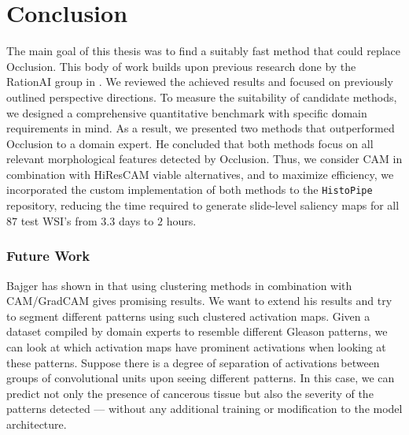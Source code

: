\chapter*{Conclusion}

The main goal of this thesis was to find a suitably fast method that could replace Occlusion.
This body of work builds upon previous research done by the RationAI group in \cite{gallo, bajger-grad-cam, krajnansky-grad-cam, hruska-grad-cam}.
We reviewed the achieved results and focused on previously outlined perspective directions.
To measure the suitability of candidate methods, we designed a comprehensive quantitative benchmark with specific domain requirements in mind.
As a result, we presented two methods that outperformed Occlusion to a domain expert.
He concluded that both methods focus on all relevant morphological features detected by Occlusion.
Thus, we consider CAM in combination with HiResCAM viable alternatives, and to maximize efficiency, we incorporated the custom implementation of both methods to the \texttt{HistoPipe} repository, reducing the time required to generate slide-level saliency maps for all $87$ test WSI's from $3.3$ days to $2$ hours.

\subsection*{Future Work}

Bajger has shown in \cite{bajger-grad-cam} that using clustering methods in combination with CAM/GradCAM gives promising results.
We want to extend his results and try to segment different patterns using such clustered activation maps.
Given a dataset compiled by domain experts to resemble different Gleason patterns, we can look at which activation maps have prominent activations when looking at these patterns.
Suppose there is a degree of separation of activations between groups of convolutional units upon seeing different patterns. In this case, we can predict not only the presence of cancerous tissue but also the severity of the patterns detected --- without any additional training or modification to the model architecture.